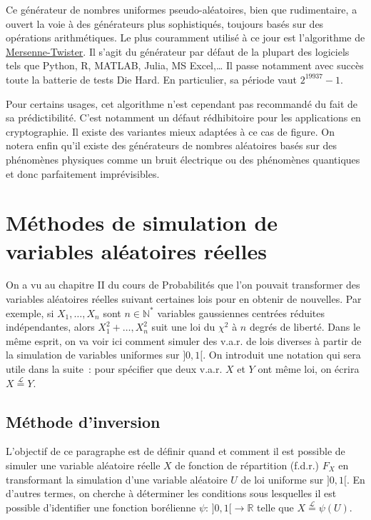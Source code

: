 \begin{exemple}
Ce générateur de nombres uniformes pseudo-aléatoires, bien que
rudimentaire, a ouvert la voie à des générateurs plus sophistiqués,
toujours basés sur des opérations arithmétiques. Le plus couramment
utilisé à ce jour est l'algorithme de
\href{https://en.wikipedia.org/wiki/Mersenne_Twister}{Mersenne-Twister}.
Il s'agit du générateur par défaut de la plupart des logiciels tels que
Python, R, MATLAB, Julia, MS Excel,\ldots{} Il passe notamment avec
succès toute la batterie de tests Die Hard. En particulier, sa période
vaut \(2^{19937} - 1\).

Pour certains usages, cet algorithme n'est cependant pas recommandé du
fait de sa prédictibilité. C'est notamment un défaut rédhibitoire pour
les applications en cryptographie. Il existe des variantes mieux
adaptées à ce cas de figure. On notera enfin qu'il existe des
générateurs de nombres aléatoires basés sur des phénomènes physiques
comme un bruit électrique ou des phénomènes quantiques et donc
parfaitement imprévisibles.
\end{exemple}

\chapter{Méthodes de simulation de variables aléatoires
réelles}\label{V-muxe9thodes-de-simulation-de-variables-aluxe9atoires-ruxe9elles}

On a vu au chapitre II du cours de Probabilités que l'on pouvait
transformer des variables aléatoires réelles suivant certaines lois pour
en obtenir de nouvelles. Par exemple, si \(X_1,\dots,X_n\) sont
\(n\in\mathbb{N}^\ast\) variables gaussiennes centrées réduites
indépendantes, alors \(X_1^2+\dots,X_n^2\) suit une loi du \(\chi^2\) à
\(n\) degrés de liberté. Dans le même esprit, on va voir ici comment
simuler des v.a.r. de lois diverses à partir de la simulation de
variables uniformes sur \(]0,1[\). On introduit une notation qui sera
utile dans la suite~: pour spécifier que deux v.a.r. \(X\) et \(Y\) ont
même loi, on écrira \(X \overset{\mathcal{L}}{=} Y\).

\section{Méthode d'inversion}\label{V-muxe9thode-dinversion}

L'objectif de ce paragraphe est de définir quand et comment il est
possible de simuler une variable aléatoire réelle \(X\) de fonction de
répartition (f.d.r.) \(F_X\) en transformant la simulation d'une
variable aléatoire \(U\) de loi uniforme sur \(]0,1[\). En d'autres
termes, on cherche à déterminer les conditions sous lesquelles il est
possible d'identifier une fonction borélienne
\(\psi :\,]0,1[ \to \mathbb{R}\) telle que
\(X \overset{\mathcal{L}}{=} \psi(U)\).


